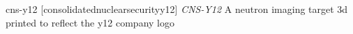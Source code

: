 \newglsXterm%
{cns-y12}%
[consolidatednuclearsecurityy12]%
{\textit{CNS{\--}Y12}}%
{A neutron imaging target \gls{3d} printed to reflect the \gls{y12} company logo}%
